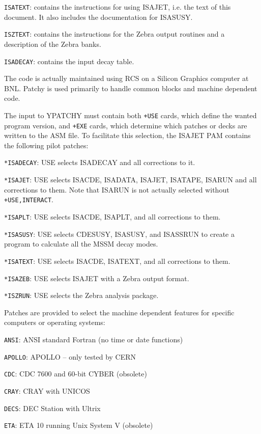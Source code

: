       \verb|ISATEXT|: contains the instructions for using ISAJET, i.e.
the text of this document. It also includes the documentation for
ISASUSY.

      \verb|ISZTEXT|: contains the instructions for the Zebra output
routines and a description of the Zebra banks.

      \verb|ISADECAY|: contains the input decay table.

      The code is actually maintained using RCS on a Silicon Graphics
computer at BNL. Patchy is used primarily to handle common blocks and
machine dependent code.

      The input to YPATCHY must contain both \verb|+USE| cards, which
define the wanted program version, and \verb|+EXE| cards, which
determine which patches or decks are written to the ASM file. To
facilitate this selection, the ISAJET PAM contains the following pilot
patches:

      \verb|*ISADECAY|: USE selects ISADECAY and all corrections to it.

      \verb|*ISAJET|: USE selects ISACDE, ISADATA, ISAJET, ISATAPE,
ISARUN and all corrections to them. Note that ISARUN is not actually
selected without \verb|+USE,INTERACT|.

      \verb|*ISAPLT|: USE selects ISACDE, ISAPLT, and all corrections
to them.

      \verb|*ISASUSY|: USE selects CDESUSY, ISASUSY, and ISASSRUN to
create a program to calculate all the MSSM decay modes.

      \verb|*ISATEXT|: USE selects ISACDE, ISATEXT, and all corrections
to them. 

      \verb|*ISAZEB|: USE selects ISAJET with a Zebra output format.

      \verb|*ISZRUN|: USE selects the Zebra analysis package.

      Patches are provided to select the machine dependent features for
specific computers or operating systems:

      \verb|ANSI|: ANSI standard Fortran (no time or date functions)

      \verb|APOLLO|: APOLLO -- only tested by CERN

      \verb|CDC|: CDC 7600 and 60-bit CYBER (obsolete)

      \verb|CRAY|: CRAY with UNICOS

      \verb|DECS|: DEC Station with Ultrix 

      \verb|ETA|: ETA 10 running Unix System V (obsolete)

